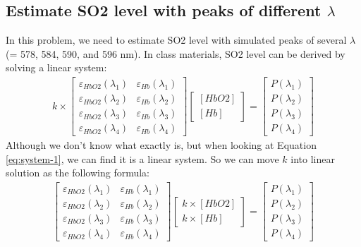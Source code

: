 \documentclass{article}
\begin{document}
\subsection{Estimate SO2 level with peaks of different $\lambda$}
\label{sec:p2a}
In this problem, we need to estimate SO2 level with simulated peaks of several $\lambda$ (= 578, 584, 590, and 596 nm). In class
materials, SO2 level can be derived by solving a linear system:
\begin{align}
    k \times
    \begin{bmatrix}
        \varepsilon_{HbO2}(\lambda_1) & \varepsilon_{Hb}(\lambda_1) \\
        \varepsilon_{HbO2}(\lambda_2) & \varepsilon_{Hb}(\lambda_2) \\
        \varepsilon_{HbO2}(\lambda_3) & \varepsilon_{Hb}(\lambda_3) \\
        \varepsilon_{HbO2}(\lambda_4) & \varepsilon_{Hb}(\lambda_4)
    \end{bmatrix}
    \begin{bmatrix}
        [HbO2] \\
        [Hb]
    \end{bmatrix}
    = 
    \begin{bmatrix}
        P(\lambda_1) \\
        P(\lambda_2) \\
        P(\lambda_3) \\
        P(\lambda_4) 
    \end{bmatrix}
    \label{eq:system-1}
\end{align}
Although we don't know what exactly is, but when looking at Equation \ref{eq:system-1}, we can find it is a linear system. So 
we can move $k$ into linear solution as the following formula:
\begin{align}
    \begin{bmatrix}
        \varepsilon_{HbO2}(\lambda_1) & \varepsilon_{Hb}(\lambda_1) \\
        \varepsilon_{HbO2}(\lambda_2) & \varepsilon_{Hb}(\lambda_2) \\
        \varepsilon_{HbO2}(\lambda_3) & \varepsilon_{Hb}(\lambda_3) \\
        \varepsilon_{HbO2}(\lambda_4) & \varepsilon_{Hb}(\lambda_4)
    \end{bmatrix}
    \begin{bmatrix}
        k \times [HbO2] \\
        k \times [Hb]
    \end{bmatrix}
    = 
    \begin{bmatrix}
        P(\lambda_1) \\
        P(\lambda_2) \\
        P(\lambda_3) \\
        P(\lambda_4) 
    \end{bmatrix}
    \label{eq:system-2}
\end{align}
\end{document}
